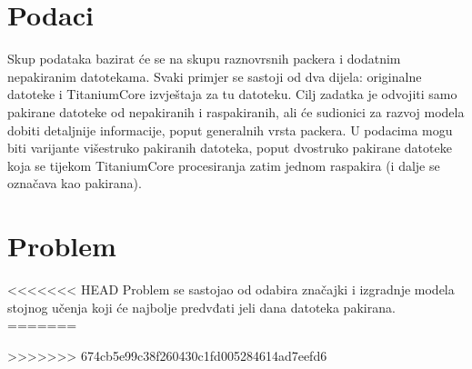 \documentclass[conference]{IEEEtran}
\begin{document}
\section{Podaci}
Skup podataka bazirat će se na skupu raznovrsnih packera 
i dodatnim nepakiranim datotekama. Svaki primjer se sastoji 
od dva dijela: originalne datoteke i TitaniumCore izvještaja 
za tu datoteku. 
Cilj zadatka je odvojiti samo pakirane datoteke od 
nepakiranih i raspakiranih, ali će sudionici za razvoj 
modela dobiti detaljnije informacije, poput generalnih 
vrsta packera. U podacima mogu biti varijante višestruko 
pakiranih datoteka, poput dvostruko pakirane datoteke 
koja se tijekom TitaniumCore procesiranja zatim 
jednom raspakira (i dalje se označava kao pakirana).

\section{Problem}
<<<<<<< HEAD
Problem se sastojao od odabira značajki i izgradnje modela stojnog učenja koji će najbolje predvđati jeli dana datoteka pakirana.
=======


>>>>>>> 674cb5e99c38f260430c1fd005284614ad7eefd6
\end{document}
